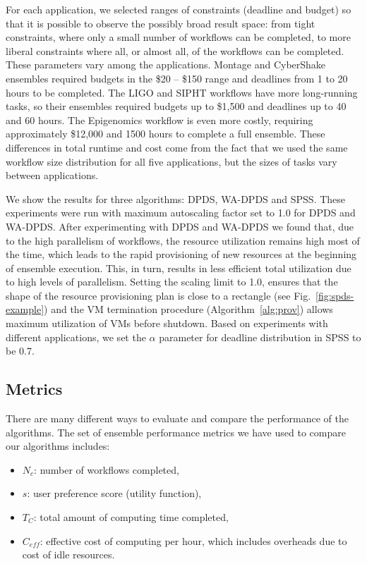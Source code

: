 \documentclass{sig-alternate}
\begin{document}
For each application, we selected ranges of constraints (deadline and budget) so
that it is possible to observe the possibly broad result space: from tight 
constraints, where only a small number of workflows can be completed, to 
more liberal constraints where all, or almost all, of the workflows can be 
completed. These parameters vary among the applications. Montage and CyberShake 
ensembles required budgets in the \$20 -- \$150 range and deadlines from 1 to
20 hours to be completed. The LIGO and SIPHT workflows have more long-running
tasks, so their ensembles required budgets up to \$1,500 and deadlines up to 
40 and 60 hours. The Epigenomics workflow is even more costly, requiring 
approximately \$12,000 and 1500 hours to complete a full ensemble. These
differences in total runtime and cost come from the fact that we used the
same workflow size distribution for all five applications, but
the sizes of tasks vary between applications.

We show the results for three algorithms: DPDS, WA-DPDS and SPSS. These 
experiments were run with maximum autoscaling factor set to 1.0 for
DPDS and WA-DPDS. After experimenting with DPDS and WA-DPDS we found that, 
due to the high parallelism of workflows, the resource utilization remains 
high most of the time, which leads to the rapid provisioning of new resources 
at the beginning of ensemble execution. This, in turn, results in less 
efficient total utilization due to high levels of parallelism. Setting the 
scaling limit to 1.0, ensures that the shape of the resource provisioning 
plan  is close to a rectangle (see Fig.~\ref{fig:spds-example}) and the VM 
termination procedure (Algorithm~\ref{alg:prov}) allows maximum utilization 
of VMs before shutdown. Based on experiments with different applications, 
we set the $\alpha$ parameter for deadline distribution in SPSS to be 0.7.



\subsection{Metrics}

There are many different ways to evaluate and compare the performance of 
the algorithms. The set of ensemble performance metrics we have used to
compare our algorithms includes:

\begin{itemize}
  \item $N_c$: number of workflows completed,
  \item $s$: user preference score (utility function),
  \item $T_C$: total amount of computing time completed,
  \item $C_{eff}$: effective cost of computing per hour, which includes
  overheads due to cost of idle resources.
\end{itemize}
\end{document}
